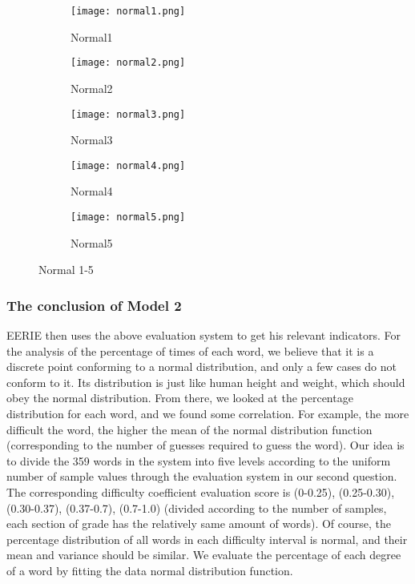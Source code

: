 \documentclass[12pt]{article}  %
\begin{document}
\begin{figure}[htbp]
	
	\begin{subfigure}[b]{.33\textwidth}
		\texttt{[image: normal1.png]}
		\caption{Normal1}\label{subfig:left}
	\end{subfigure}
	\begin{subfigure}[b]{.33\textwidth}
		\texttt{[image: normal2.png]}
		\caption{Normal2}\label{subfig:right}
	\end{subfigure}
   \begin{subfigure}[b]{.33\textwidth}
        \texttt{[image: normal3.png]}
	    \caption{Normal3}\label{subfig:right}
    \end{subfigure}

\begin{subfigure}[b]{.33\textwidth}
		\texttt{[image: normal4.png]}
		\caption{Normal4}\label{subfig:left}
	\end{subfigure}
	\begin{subfigure}[b]{.33\textwidth}
		\texttt{[image: normal5.png]}
		\caption{Normal5}\label{subfig:right}
	\end{subfigure}

	\caption{Normal 1-5 }\label{fig:subfigures}
\end{figure}

\clearpage

\subsubsection{The conclusion of Model 2}
EERIE then uses the above evaluation system to get his relevant indicators.
For the analysis of the percentage of times of each word, we believe that it is a discrete point conforming to a normal distribution, and only a few cases do not conform to it. Its distribution is just like human height and weight, which should obey the normal distribution.
From there, we looked at the percentage distribution for each word, and we found some correlation. For example, the more difficult the word, the higher the mean of the normal distribution function (corresponding to the number of guesses required to guess the word).
Our idea is to divide the 359 words in the system into five levels according to the uniform number of sample values through the evaluation system in our second question. The corresponding difficulty coefficient evaluation score is (0-0.25), (0.25-0.30), (0.30-0.37), (0.37-0.7), (0.7-1.0) (divided according to the number of samples, each section of grade has the relatively same amount of words). Of course, the percentage distribution of all words in each difficulty interval is normal, and their mean and variance should be similar.
We evaluate the percentage of each degree of a word by fitting the data normal distribution function.
\end{document}
